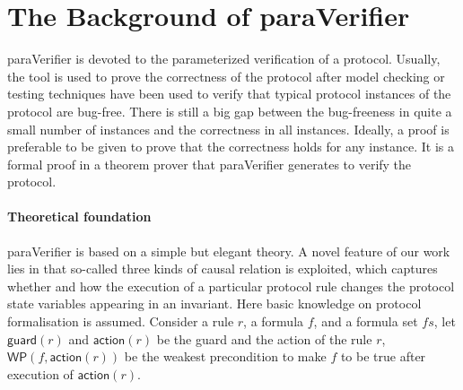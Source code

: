 \documentclass{llncs-new}
\newcommand{\bedt}[1]{{\color{black}#1}}
\begin{document}
\vspace{-10pt}
\section{The Background  of {\sf paraVerifier}\label{sec:Preliminaries}}
\vspace{-5pt}
{\sf paraVerifier} is devoted to the parameterized verification of a protocol. Usually, the tool is used to prove the correctness of the protocol after model checking or testing techniques have been used to verify that typical protocol instances of the protocol  are bug-free. There is still a big gap between the bug-freeness in quite a small number of instances and the correctness in all instances.  Ideally, a proof is preferable to be given to  prove that the correctness holds for any instance. It is a formal proof in a theorem prover that {\sf paraVerifier} generates to verify the protocol. %

\vspace{-15pt}

\paragraph{Theoretical foundation}  {\sf paraVerifier} is based on a simple but elegant theory.  %
A novel feature of our work lies in that   so-called three kinds of causal
relation is exploited, which captures whether and how the execution of a particular protocol rule changes the protocol state variables appearing in an invariant. Here  basic knowledge on protocol formalisation is assumed. Consider a rule $r$, a formula $f$, and a formula set $fs$, let $\mathsf{guard}(r)$ and $\mathsf{action}( r)$ be the guard and the action of the rule $r$, $\mathsf{WP}( f,\mathsf{action}( r))$ be the weakest precondition to make $f$ to be true after execution of $\mathsf{action}( r)$.
\end{document}
